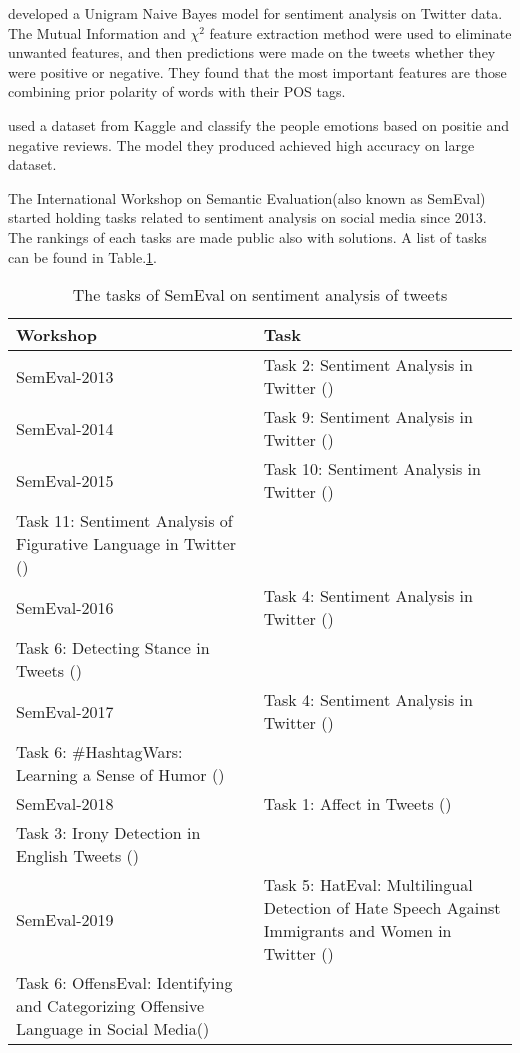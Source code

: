 \cite{opinionMiningLiang2013} developed a Unigram Naive Bayes model for
sentiment analysis on Twitter data. The Mutual Information and $\chi^2$ feature
extraction method were used to eliminate unwanted features, and then predictions
were made on the tweets whether they were positive or negative. They found that
the most important features are those combining prior polarity of words with
their POS tags.

\cite{bhavsar2019sentiment} used a dataset from Kaggle and classify the people
emotions based on positie and negative reviews. The model they produced achieved
high accuracy on large dataset.

The International Workshop on Semantic Evaluation(also known as SemEval)
started holding tasks related to sentiment analysis on social media since 2013.
The rankings of each tasks are made public also with solutions. A list of tasks
can be found in Table.\ref{table:SemEvalTasks}. %


\begin{table}[h]
  \caption{The tasks of SemEval on sentiment analysis of tweets}
  \label{table:SemEvalTasks}
  \centering
  \renewcommand{\tabularxcolumn}{m} %
  \begin{tabularx}{\textwidth}{l >{\raggedright}X}
    \toprule
    \textbf{Workshop} & \textbf{Task}
    \tabularnewline \midrule
    SemEval-2013
    &
    Task 2: Sentiment Analysis in Twitter (\cite{SemEval2013Task2})
    \tabularnewline \hline
    SemEval-2014
    &
    Task 9: Sentiment Analysis in Twitter (\cite{SemEval2014Task9})
    \tabularnewline \hline
    SemEval-2015
    &
    Task 10: Sentiment Analysis in Twitter (\cite{SemEval2015Task10})\\
    Task 11: Sentiment Analysis of Figurative Language in Twitter
    (\cite{SemEval2015Task11})
    \tabularnewline \hline
    SemEval-2016
    &
    Task 4: Sentiment Analysis in Twitter (\cite{SemEval2016Task4})\\
    Task 6: Detecting Stance in Tweets (\cite{SemEval2016Task6})
    \tabularnewline \hline
    SemEval-2017
    &
    Task 4: Sentiment Analysis in Twitter (\cite{SemEval2017Task4})\\
    Task 6: \#HashtagWars: Learning a Sense of Humor (\cite{SemEval2017Task6})
    \tabularnewline \hline
    SemEval-2018
    &
    Task 1: Affect in Tweets (\cite{SemEval2018Task1})\\
    Task 3: Irony Detection in English Tweets (\cite{SemEval2018Task3})
    \tabularnewline \hline
    SemEval-2019
    &
    Task 5: HatEval: Multilingual Detection of Hate Speech Against Immigrants
    and Women in Twitter (\cite{SemEval2019Task5})\\
    Task 6: OffensEval: Identifying and Categorizing Offensive Language in
    Social Media(\cite{SemEval2019Task6})
    \tabularnewline \bottomrule
  \end{tabularx}
\end{table}
